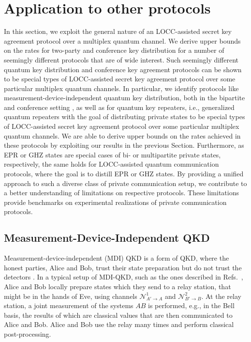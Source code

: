 \documentclass[aps,pra,twocolumn,superscriptaddress,longbibliography]{revtex4-1}
\newcommand{\mc}[1]{\mathcal{#1}}
\begin{document}
\section{Application to other protocols}\label{sec:Appl}
In this section, we exploit the general nature of an LOCC-assisted secret key agreement protocol over a multiplex quantum channel. We derive upper bounds on the rates for two-party and conference key distribution for a number of seemingly different protocols that are of wide interest. Such seemingly different quantum key distribution and conference key agreement protocols can be shown to be special types of LOCC-assisted secret key agreement protocol over some particular multiplex quantum channels. In particular, we identify protocols like measurement-device-independent quantum key distribution, both in the bipartite \cite{braunstein2012side,LCQ+12} and conference setting \cite{FYCC15,PhysRevA.93.022325,OLLP19}, as well as for quantum key repeaters, i.e., generalized quantum repeaters with the goal of distributing private states \cite{bauml2015limitations,CM17,christandl2017private} to be special types of LOCC-assisted secret key agreement protocol over some particular multiplex quantum channels. We are able to derive upper bounds on the rates achieved in these protocols by exploiting our results in the previous Section. Furthermore, as EPR or GHZ states are special cases of bi- or multipartite private states, respectively, the same holds for LOCC-assisted quantum communication protocols, where the goal is to distill EPR or GHZ states. By providing a unified approach to such a diverse class of private communication setup, we contribute to a better understanding of limitations on respective protocols. These limitations provide benchmarks on experimental realizations of private communication protocols.

\subsection{Measurement-Device-Independent QKD}
Measurement-device-independent (MDI) QKD is a form of QKD, where the honest parties, Alice and Bob, trust their state preparation but do not trust the detectors \cite{braunstein2012side,LCQ+12}. In a typical setup of MDI-QKD, such as the ones described in Refs.~\cite{braunstein2012side,LCQ+12}, Alice and Bob locally prepare states which they send to a relay station, that might be in the hands of Eve, using channels ${\mc N}^1_{A'\to A}$ and ${\mc N}^2_{B'\to B}$. At the relay station, a joint measurement of the systems $AB$ is performed, e.g., in the Bell basis, the results of which are classical values that are then communicated to Alice and Bob. Alice and Bob use the relay many times and perform classical post-processing. 
\end{document}

